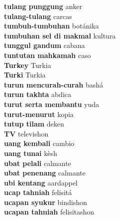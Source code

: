\textbf{ tulang punggung  } anker \\
\textbf{ tulang-tulang  } carcas \\
\textbf{ tumbuh-tumbuhan  } botánika \\
\textbf{ tumbuhan sel di makmal  } kultura \\
\textbf{ tunggul gandum  } cabana \\
\textbf{ tuntutan mahkamah  } caso \\
\textbf{ Turkey  } Turkia \\
\textbf{ Turki  } Turkia \\
\textbf{ turun mencurah-curah  } bashá \\
\textbf{ turun takhta  } abdica \\
\textbf{ turut serta membantu  } yuda \\
\textbf{ turut-menurut  } kopia \\
\textbf{ tutup tilam  } deken \\
\textbf{ TV  } televishon \\
\textbf{ uang kembali  } cambio \\
\textbf{ uang tunai  } kèsh \\
\textbf{ ubat pelali  } calmante \\
\textbf{ ubat penenang  } calmante \\
\textbf{ ubi kentang  } aardappel \\
\textbf{ ucap tahniah  } felisitá \\
\textbf{ ucapan syukur  } bindishon \\
\textbf{ ucapan tahniah  } felisitashon \\
